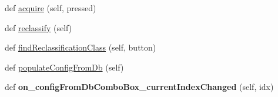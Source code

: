 \begin{DoxyCompactItemize}
\item 
def \mbox{\hyperlink{class_dsg_tools_1_1_production_tools_1_1_field_tool_box_1_1field__toolbox_1_1_field_toolbox_a01778366fc84013a9a8586c4ee65850b}{acquire}} (self, pressed)
\item 
def \mbox{\hyperlink{class_dsg_tools_1_1_production_tools_1_1_field_tool_box_1_1field__toolbox_1_1_field_toolbox_a55f4b1700bd0416f59d955f57f1f9744}{reclassify}} (self)
\item 
def \mbox{\hyperlink{class_dsg_tools_1_1_production_tools_1_1_field_tool_box_1_1field__toolbox_1_1_field_toolbox_aa7bb0c934bf00c2b283851933e9c7094}{find\+Reclassification\+Class}} (self, button)
\item 
def \mbox{\hyperlink{class_dsg_tools_1_1_production_tools_1_1_field_tool_box_1_1field__toolbox_1_1_field_toolbox_a9fbe4ec85e2198e9a371582c01daf93b}{populate\+Config\+From\+Db}} (self)
\item 
\mbox{\label{class_dsg_tools_1_1_production_tools_1_1_field_tool_box_1_1field__toolbox_1_1_field_toolbox_a3d4fb4836bce3234232c617611e491c7}} 
def {\bfseries on\+\_\+config\+From\+Db\+Combo\+Box\+\_\+current\+Index\+Changed} (self, idx)
\end{DoxyCompactItemize}
